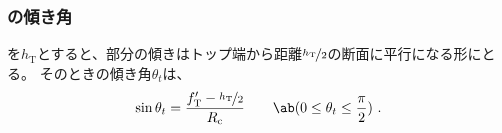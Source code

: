 \subsubsection{\TopCurvedOutcut の傾き角}
\TopOutcutLength を$h_\mathrm T$とすると、\nameCurvedOutcut 部分の傾きはトップ端から距離$\nicefrac{h_\mathrm T}2$の断面に平行になる形にとる。
そのときの傾き角$\theta_t$は、
\begin{align}
  \label{eq:TCurvedOutcutAngle}
  \sin\theta_t = \frac{f_\mathrm T'-\nicefrac{h_\mathrm T}2}{R_\mathrm c}
  \qquad\ab(0 \leq \theta_t \leq \frac\pi2)\ .
\end{align}

